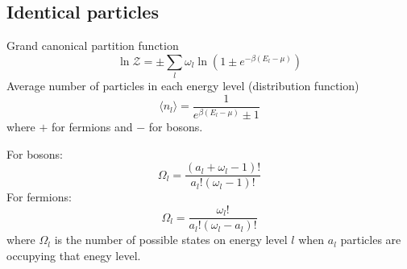 \documentclass{article}
\begin{document}
\subsection{Identical particles}
Grand canonical partition function
$$\ln\mathcal{Z} = \pm\sum_{l}\omega_l\ln(1\pm e^{-\beta(E_l-\mu)})$$
Average number of particles in each energy level (distribution function)
$$\langle n_l \rangle = \frac{1}{e^{\beta(E_l-\mu)}\pm 1}$$
where $+$ for fermions and $-$ for bosons.

For bosons:
$$\Omega_l = \frac{(a_l+\omega_l-1)!}{a_l!(\omega_l-1)!}$$
For fermions:
$$\Omega_l = \frac{\omega_l!}{a_l!(\omega_l-a_l)!}$$
where $\Omega_l$ is the number of possible states on energy level $l$ when $a_l$ particles are occupying 
that enegy level. 
\end{document}
